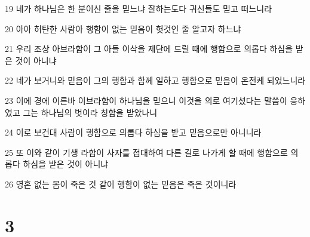 \par 19 네가 하나님은 한 분이신 줄을 믿느냐 잘하는도다 귀신들도 믿고 떠느니라
\par 20 아아 허탄한 사람아 행함이 없는 믿음이 헛것인 줄 알고자 하느냐
\par 21 우리 조상 아브라함이 그 아들 이삭을 제단에 드릴 때에 행함으로 의롭다 하심을 받은 것이 아니냐
\par 22 네가 보거니와 믿음이 그의 행함과 함께 일하고 행함으로 믿음이 온전케 되었느니라
\par 23 이에 경에 이른바 이브라함이 하나님을 믿으니 이것을 의로 여기셨다는 말씀이 응하였고 그는 하나님의 벗이라 칭함을 받았나니
\par 24 이로 보건대 사람이 행함으로 의롭다 하심을 받고 믿음으로만 아니니라
\par 25 또 이와 같이 기생 라합이 사자를 접대하여 다른 길로 나가게 할 때에 행함으로 의롭다 하심을 받은 것이 아니냐
\par 26 영혼 없는 몸이 죽은 것 같이 행함이 없는 믿음은 죽은 것이니라

\chapter{3}

